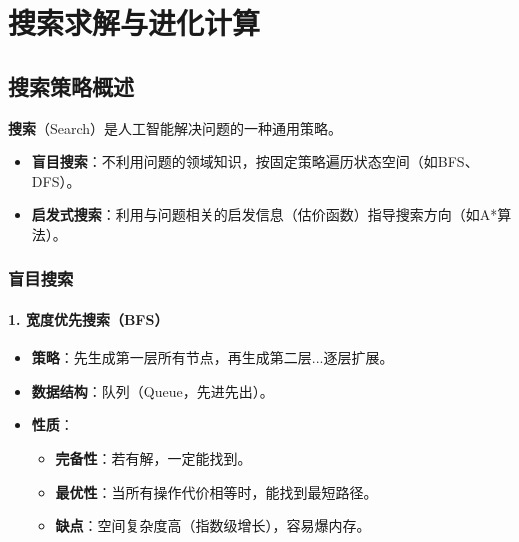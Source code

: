 \chapter{搜索求解与进化计算}

\section{搜索策略概述}

\begin{conceptbox}
\textbf{搜索}（Search）是人工智能解决问题的一种通用策略。
\begin{itemize}[leftmargin=2em,itemsep=0pt]
    \item \textbf{盲目搜索}：不利用问题的领域知识，按固定策略遍历状态空间（如BFS、DFS）。
    \item \textbf{启发式搜索}：利用与问题相关的启发信息（估价函数）指导搜索方向（如A*算法）。
\end{itemize}
\end{conceptbox}

\subsection{盲目搜索}

\subsubsection{1. 宽度优先搜索（BFS）}
\begin{itemize}[leftmargin=2em,itemsep=0pt]
    \item \textbf{策略}：先生成第一层所有节点，再生成第二层...逐层扩展。
    \item \textbf{数据结构}：队列（Queue，先进先出）。
    \item \textbf{性质}：
    \begin{itemize}
        \item \textbf{完备性}：若有解，一定能找到。
        \item \textbf{最优性}：当所有操作代价相等时，能找到最短路径。
        \item \textbf{缺点}：空间复杂度高（指数级增长），容易爆内存。
    \end{itemize}
\end{itemize}

